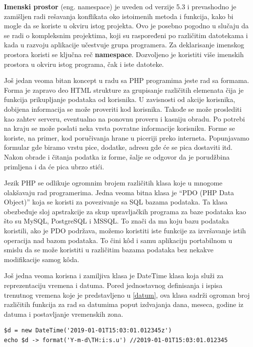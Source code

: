 \documentclass[a4paper]{article}
\begin{document}
{\textbf{Imenski prostor} (eng. namespace) \cite{phpSrbija} je uveden od verzije 5.3 i prevashodno je zamišljen radi rešavanja konflikata oko istoimenih metoda i funkcija, kako bi mogle da se koriste u okviru istog projekta. Ovo je posebno pogodno u slučaju da se radi o kompleksnim projektima, koji su raspoređeni po različitim datotekama i kada u razvoju aplikacije učestvuje grupa programera. Za deklarisanje imenskog prostora koristi se ključna reč \textbf{namespace}. Dozvoljeno je koristiti više imenskih prostora u okviru istog programa, čak i iste datoteke.

Još jedan veoma bitan koncept u radu sa PHP programima jeste rad sa formama. Forma je zapravo deo HTML strukture za grupisanje različitih elemenata čija je funkcija prikupljanje podataka od korisnika. U zavisnosti od akcije korisnika, dobijena informacija se može proveriti kod korisnika. Takođe se može proslediti kao zahtev serveru, eventualno na ponovnu proveru i kasniju obradu. Po potrebi na kraju se može poslati neka vrsta povratne informacije korisniku. Forme se koriste, na primer, kod poručivanja hrane u piceriji preko interneta. Popunjavamo formular gde biramo vrstu pice, dodatke, adresu gde će se pica dostaviti itd. Nakon obrade i čitanja podatka iz forme, šalje se odgovor da je porudžbina primljena i da će pica ubrzo stići.

Jezik PHP se odlikuje ogromnim brojem različitih klasa koje u mnogome olakšavaju rad programerima. Jedna veoma bitna klasa je “PDO (PHP Data Object)”\cite{PHPtheGoodParts, phpSrbija} koja se koristi za povezivanje sa SQL bazama podataka. Ta klasa obezbeđuje sloj apstrakcije za skup upravljačkih programa za baze podataka kao što su MySQL, PostgreSQL i MSSQL. To znači da ma koju bazu podataka koristili, ako je PDO podržava, možemo koristiti iste funkcije za izvršavanje istih operacija nad bazom podataka. To čini k\^{o}d i samu aplikaciju portabilnom u smislu da se može koristiti u različitim bazama podataka bez nekakve modifikacije samog k\^{o}da.

Još jedna veoma korisna i zamiljiva klasa je DateTime klasa \cite{PHPtheGoodParts, phpSrbija} koja služi za reprezentaciju vremena i datuma. Pored jednostavnog definisanja i ispisa trenutnog vremena koje je predstavljeno u \ref{datum}, ova klasa sadrži ogroman broj različitih funkcija za rad sa datumima poput izdvajanja dana, meseca, godine iz datuma i postavljanje vremenskih zona. 

\begin{lstlisting}[caption={Primer upotrebe klase DateTime},frame=single, label=datum]
$d = new DateTime('2019-01-01T15:03:01.012345z')
echo $d -> format('Y-m-d\TH:i:s.u') //2019-01-01T15:03:01.012345
\end{lstlisting}

}
\end{document}
